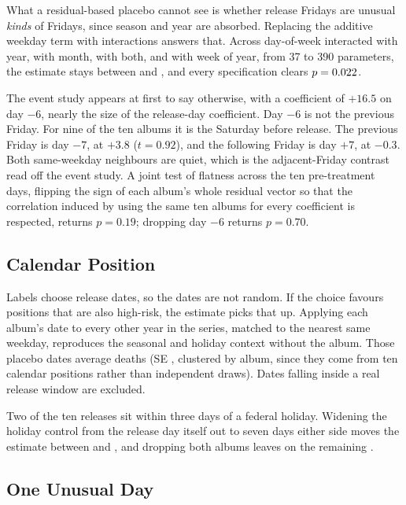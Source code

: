 \documentclass[11pt]{article}
\begin{document}
What a residual-based placebo cannot see is whether release Fridays are unusual \emph{kinds} of
Fridays, since season and year are absorbed. Replacing the additive weekday term with interactions
answers that. Across day-of-week interacted with year, with month, with both, and with week of
year, from 37 to 390 parameters, the estimate stays between \numEffectDowInteractMin{} and
\numEffectDowInteractMax{}, and every specification clears $p = 0.022$.



The event study appears at first to say otherwise, with a coefficient of $+16.5$ on day $-6$,
nearly the size of the release-day coefficient. Day $-6$ is not the previous Friday. For nine of
the ten albums it is the Saturday before release. The previous Friday is day $-7$, at $+3.8$
($t = 0.92$), and the following Friday is day $+7$, at $-0.3$. Both same-weekday neighbours are
quiet, which is the adjacent-Friday contrast read off the event study. A joint test of flatness
across the ten pre-treatment days, flipping the sign of each album's whole residual vector so that
the correlation induced by using the same ten albums for every coefficient is respected, returns
$p = 0.19$; dropping day $-6$ returns $p = 0.70$.

\subsection{Calendar Position}

Labels choose release dates, so the dates are not random. If the choice favours positions that are
also high-risk, the estimate picks that up. Applying each album's date to every other year in the
series, matched to the nearest same weekday, reproduces the seasonal and holiday context without
the album. Those \numNCalendarPlacebo{} placebo dates average \numEffectCalendarPlacebo{} deaths
(SE \numSECalendarPlacebo{}, clustered by album, since they come from ten calendar positions
rather than \numNCalendarPlacebo{} independent draws). Dates falling inside a real release window
are excluded.

Two of the ten releases sit within three days of a federal holiday. Widening the holiday control
from the release day itself out to seven days either side moves the estimate between
\numEffectHolAdjMin{} and \numEffectHolAdjMax{}, and dropping both albums leaves
\numEffectDropHolAdj{} on the remaining \numNDropHolAdj{}.

\subsection{One Unusual Day}
\end{document}
